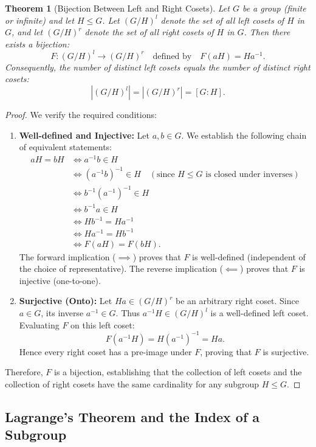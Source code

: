 \documentclass[12pt]{article}
\theoremstyle{definition}
\theoremstyle{plain}
\newtheorem{theorem}{Theorem}[section]
\begin{document}
\begin{theorem}[Bijection Between Left and Right Cosets]
Let $G$ be a group (finite or infinite) and let $H \le G$. Let $(G/H)^l$ denote the set of all left cosets of $H$ in $G$, and let $(G/H)^r$ denote the set of all right cosets of $H$ in $G$.
Then there exists a bijection:
\[
F: (G/H)^l \longrightarrow (G/H)^r \quad \text{defined by} \quad F(aH) = Ha^{-1}.
\]
Consequently, the number of distinct left cosets equals the number of distinct right cosets:
\[
|(G/H)^l| = |(G/H)^r| = [G : H].
\]
\end{theorem}
\begin{proof}
We verify the required conditions:
\begin{enumerate}
    \item \textbf{Well-defined and Injective:}
    Let $a, b \in G$. We establish the following chain of equivalent statements:
    \begin{align*}
        aH = bH &\iff a^{-1}b \in H \\
        &\iff (a^{-1}b)^{-1} \in H \quad (\text{since } H \le G \text{ is closed under inverses}) \\
        &\iff b^{-1}(a^{-1})^{-1} \in H \\
        &\iff b^{-1}a \in H \\
        &\iff Hb^{-1} = Ha^{-1} \\
        &\iff Ha^{-1} = Hb^{-1} \\
        &\iff F(aH) = F(bH).
    \end{align*}
    The forward implication ($\implies$) proves that $F$ is well-defined (independent of the choice of representative).
    The reverse implication ($\impliedby$) proves that $F$ is injective (one-to-one).
    
    \item \textbf{Surjective (Onto):}
    Let $Ha \in (G/H)^r$ be an arbitrary right coset.
    Since $a \in G$, its inverse $a^{-1} \in G$. Thus $a^{-1}H \in (G/H)^l$ is a well-defined left coset.
    Evaluating $F$ on this left coset:
    \[
    F(a^{-1}H) = H(a^{-1})^{-1} = Ha.
    \]
    Hence every right coset has a pre-image under $F$, proving that $F$ is surjective.
\end{enumerate}
Therefore, $F$ is a bijection, establishing that the collection of left cosets and the collection of right cosets have the same cardinality for any subgroup $H \le G$.
\end{proof}


\subsection{Lagrange's Theorem and the Index of a Subgroup}
\end{document}
